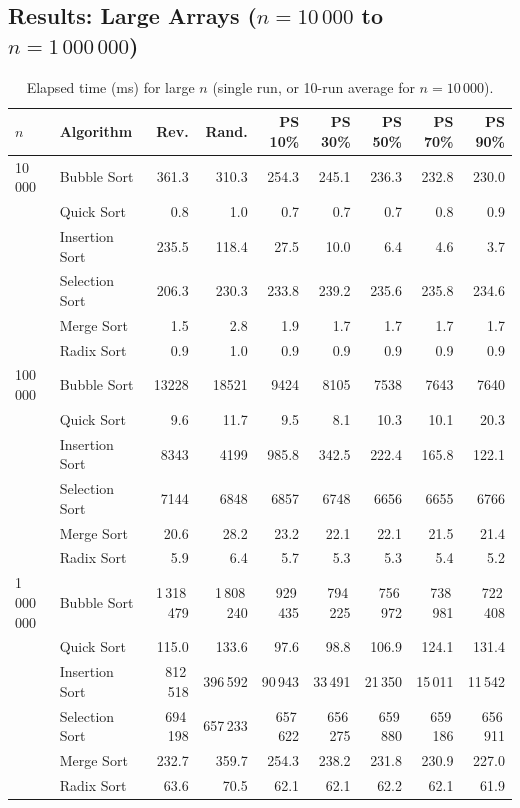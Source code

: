 \documentclass[11pt,a4paper]{article}
\begin{document}
\subsection{Results: Large Arrays ($n = 10\,000$ to $n = 1\,000\,000$)}

\begin{table}[H]
\centering\footnotesize
\setlength{\tabcolsep}{4.5pt}
\caption{Elapsed time (ms) for large $n$ (single run, or 10-run average for $n=10\,000$).}
\label{tab:large}
\begin{tabular}{llrrrrrrr}
\toprule
$n$ & \textbf{Algorithm} & \textbf{Rev.} & \textbf{Rand.} & \textbf{PS 10\%} & \textbf{PS 30\%} & \textbf{PS 50\%} & \textbf{PS 70\%} & \textbf{PS 90\%} \\
\midrule
10\,000 & Bubble Sort    & 361.3  & 310.3  & 254.3  & 245.1 & 236.3 & 232.8 & 230.0 \\
        & Quick Sort     & 0.8    & 1.0    & 0.7    & 0.7   & 0.7   & 0.8   & 0.9   \\
        & Insertion Sort & 235.5  & 118.4  & 27.5   & 10.0  & 6.4   & 4.6   & 3.7   \\
        & Selection Sort & 206.3  & 230.3  & 233.8  & 239.2 & 235.6 & 235.8 & 234.6 \\
        & Merge Sort     & 1.5    & 2.8    & 1.9    & 1.7   & 1.7   & 1.7   & 1.7   \\
        & Radix Sort     & 0.9    & 1.0    & 0.9    & 0.9   & 0.9   & 0.9   & 0.9   \\
\midrule
100\,000 & Bubble Sort    & 13228  & 18521  & 9424   & 8105  & 7538  & 7643  & 7640  \\
         & Quick Sort     & 9.6    & 11.7   & 9.5    & 8.1   & 10.3  & 10.1  & 20.3  \\
         & Insertion Sort & 8343   & 4199   & 985.8  & 342.5 & 222.4 & 165.8 & 122.1 \\
         & Selection Sort & 7144   & 6848   & 6857   & 6748  & 6656  & 6655  & 6766  \\
         & Merge Sort     & 20.6   & 28.2   & 23.2   & 22.1  & 22.1  & 21.5  & 21.4  \\
         & Radix Sort     & 5.9    & 6.4    & 5.7    & 5.3   & 5.3   & 5.4   & 5.2   \\
\midrule
1\,000\,000 & Bubble Sort    & 1\,318\,479 & 1\,808\,240 & 929\,435 & 794\,225 & 756\,972 & 738\,981 & 722\,408 \\
            & Quick Sort     & 115.0  & 133.6  & 97.6   & 98.8  & 106.9 & 124.1 & 131.4 \\
            & Insertion Sort & 812\,518& 396\,592& 90\,943& 33\,491& 21\,350& 15\,011& 11\,542\\
            & Selection Sort & 694\,198& 657\,233& 657\,622& 656\,275& 659\,880& 659\,186& 656\,911\\
            & Merge Sort     & 232.7  & 359.7  & 254.3  & 238.2 & 231.8 & 230.9 & 227.0 \\
            & Radix Sort     & 63.6   & 70.5   & 62.1   & 62.1  & 62.2  & 62.1  & 61.9  \\
\bottomrule
\end{tabular}
\end{table}
\end{document}
